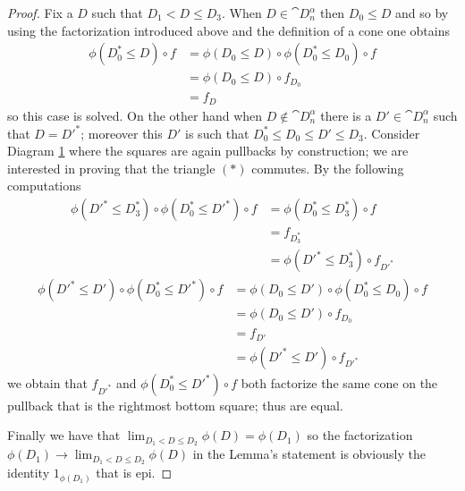 \begin{proof}
  Fix a \(D\) such that \(D_1< D\leq D_3\). When \(D\in\cat{D}_n^\alpha\) then \(D_0\leq D\) and so by using the factorization introduced above and the definition of a cone one obtains
  \begin{align*}
    \phi(D_0^*\leq D)\circ f &= \phi(D_0\leq D)\circ\phi(D_0^*\leq D_0)\circ f\\
                             &= \phi(D_0\leq D)\circ f_{D_0}\\
                             &= f_D
  \end{align*}
  so this case is solved. On the other hand when \(D\not\in\cat{D}_n^\alpha\) there is a \(D'\in\cat{D}_n^\alpha\) such that \(D = D'^*\); moreover this \(D'\) is such that \(D_0^*\leq D_0\leq D'\leq D_3\). Consider Diagram \ref{diagram:last_one} where the squares are again pullbacks by construction; we are interested in proving that the triangle \((*)\) commutes. By the following computations
  \begin{align*}
    \phi(D'^*\leq D_3^*)\circ\phi(D_0^*\leq D'^*)\circ f &= \phi(D_0^*\leq D_3^*)\circ f\\
                                                         &= f_{D_3^*}\\
                                                         &= \phi(D'^*\leq D_3^*)\circ f_{D'^*}
  \end{align*}
  \begin{align*}
    \phi(D'^*\leq D')\circ\phi(D_0^*\leq D'^*)\circ f &= \phi(D_0\leq D')\circ\phi(D_0^*\leq D_0)\circ f\\
                                                      &= \phi(D_0\leq D')\circ f_{D_0}\\
                                                      &= f_{D'}\\
                                                      &= \phi(D'^*\leq D')\circ f_{D'^*}
  \end{align*}
  we obtain that \(f_{D'^*}\) and \(\phi(D_0^*\leq D'^*)\circ f\) both factorize the same cone on the pullback that is the rightmost bottom square; thus are equal.

  \begin{figure}[h]
    \begin{center}
    \end{center}
    \caption{}
    \label{diagram:last_one}
  \end{figure}
  
  Finally we have that \(\lim_{D_1<D\leq D_2}\phi(D) = \phi(D_1)\) so the factorization \(\phi(D_1)\to\lim_{D_1<D\leq D_2}\phi(D)\) in the Lemma's statement is obviously the identity \(1_{\phi(D_1)}\) that is epi.
\end{proof}

